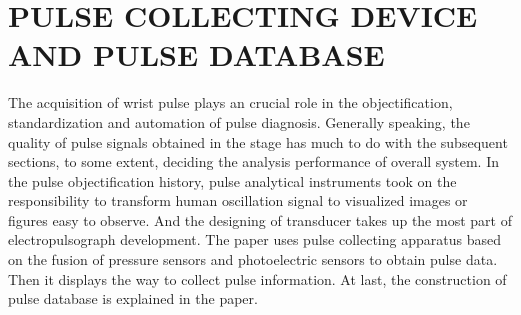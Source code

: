 \chapter[Pulse collecting device and pulse database]{\uppercase{Pulse
collecting device and pulse database}}
\label{chap:two}

The acquisition of wrist pulse plays an crucial role in the
objectification, standardization and automation of pulse diagnosis.
Generally speaking, the quality of pulse signals obtained in the stage
has much to do with the subsequent sections, to some extent, deciding
the analysis performance of overall system. In the pulse
objectification history, pulse analytical instruments took on the
responsibility to transform human oscillation signal to visualized
images or figures easy to observe. And the designing of transducer
takes up the most part of electropulsograph development. The paper 
uses pulse collecting apparatus based on the fusion of pressure
sensors and photoelectric sensors to obtain pulse data. Then it
displays the way to collect pulse information. At last, the
construction of pulse database is explained in the paper. 

